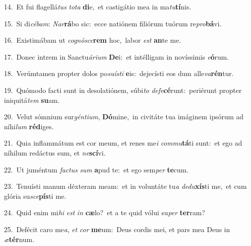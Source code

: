 {\numbfont\textcolor{\numbcolor}{14.}}~Et fui flagellá\textit{tus} \textit{to}\-\textit{ta} \textbf{di}\-e,~\star et castigátio mea in ma\-\textit{tu}\-\textbf{tí}nis.\par
{\numbfont\textcolor{\numbcolor}{15.}}~Si di\-\textit{cé}\-\textit{bam}: \textit{Nar}\-\textbf{rá}bo sic:~\star ecce natiónem filiórum tuórum re\-\textit{pro}\-\textbf{bá}vi.\par
{\numbfont\textcolor{\numbcolor}{16.}}~Existimábam ut \textit{co}\-\textit{gnó}\textit{sce}\textbf{rem} hoc,~\star labor \textit{est} \textbf{an}\-te me.\par
{\numbfont\textcolor{\numbcolor}{17.}}~Donec intrem in Sanctu\-\textit{á}\-\textit{ri}\textit{um} \textbf{De}\-i:~\star et intélligam in novíssimis \textit{e}\-\textbf{ó}rum.\par
{\numbfont\textcolor{\numbcolor}{18.}}~Verúmtamen propter dolos po\-\textit{su}\-\textit{ís}\textit{ti} \textbf{e}\-is:~\star dejecísti eos dum alle\-\textit{va}\-\textbf{rén}tur.\par
{\numbfont\textcolor{\numbcolor}{19.}}~Quómodo facti sunt in desolatiónem, súbi\textit{to} \textit{de}\-\textit{fe}\textbf{cé}runt:~\star periérunt propter iniquitá\textit{tem} \textbf{su}\-am.\par
{\numbfont\textcolor{\numbcolor}{20.}}~Velut sómnium sur\-\textit{gén}\-\textit{ti}\textit{um}, \textbf{Dó}\-mine,~\star in civitáte tua imáginem ipsórum ad níhi\textit{lum} \textbf{réd}\-iges.\par
{\numbfont\textcolor{\numbcolor}{21.}}~Quia inflammátum est cor meum, et renes me\textit{i} \textit{com}\-\textit{mu}\textbf{tá}ti sunt:~\star et ego ad níhilum redáctus sum, et \textit{ne}\-\textbf{scí}vi.\par
{\numbfont\textcolor{\numbcolor}{22.}}~Ut juméntum \textit{fac}\-\textit{tus} \textit{sum} \textbf{a}\-pud te:~\star et ego sem\textit{per} \textbf{te}\-cum.\par
{\numbfont\textcolor{\numbcolor}{23.}}~Tenuísti manum déxteram meam:~\dagger et in voluntáte tu\textit{a} \textit{de}\-\textit{du}\textbf{xís}ti me,~\star et cum glória su\-\textit{sce}\-\textbf{pís}ti me.\par
{\numbfont\textcolor{\numbcolor}{24.}}~Quid enim mi\textit{hi} \textit{est} \textit{in} \textbf{cæ}\-lo?~\star et a te quid vólui su\textit{per} \textbf{ter}\-ram?\par
{\numbfont\textcolor{\numbcolor}{25.}}~Defécit caro me\-\textit{a}\-, \textit{et} \textit{cor} \textbf{me}\-um:~\star Deus cordis mei, et pars mea Deus in \textit{æ}\-\textbf{tér}num.\par
